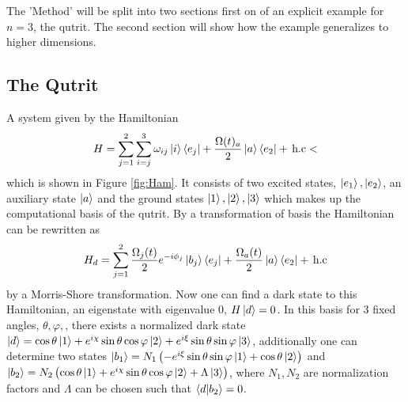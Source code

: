 
The 'Method' will be split into two sections first on of an explicit example for $n = 3$, the qutrit. The second section will show how the example generalizes to higher dimensions.


\subsection{The Qutrit}

A system given by the Hamiltonian
\begin{equation}
\label{eq:Ham}
H = \sum_{j = 1}^2 \sum_{i =j}^{3} \omega_{ij}\ket{i}\bra{e_j}  + \frac{\Omega(t)_{a}}{2}\ket{a}\bra{e_2}  +\,\text{h.c}<
\end{equation}
which is shown in Figure \ref{fig:Ham}.  It consists of two excited states, $\ket{e_1}, \ket{e_2}$, an auxiliary state $\ket{a}$ and the ground states $\ket{1}, \ket{2}, \ket{3}$ which 
makes up the computational basis of the qutrit. By a transformation of basis the Hamiltonian can be rewritten as 
\begin{equation}
\label{eq:Hamd}
H_d = \sum_{j = 1}^2 \frac{\Omega_j(t)}{2}e^{-i\phi_j}\ket{b_j}\bra{e_j}  + \frac{\Omega_a(t)}{2}\ket{a}\bra{e_2}  +\,\text{h.c}
\end{equation} 
by a Morris-Shore transformation\cite{morris}. Now one can find a dark state to this Hamiltonian, an eigenstate with eigenvalue $0$, $H\ket{d} = 0$. In this basis for 3 fixed angles, $\theta, \varphi, $, there exists a normalized dark state $\ket{d} = \cos\theta\ket{1} + e^{i\chi}\sin\theta\cos\varphi\ket{2} + e^{i\xi}\sin\theta\sin\varphi\ket{3}$, additionally one can determine two states $\ket{b_1} = N_1 \left(-e^{i\xi}\sin\theta\sin\varphi\ket{1} + \cos\theta\ket{2} \right)$ and $\ket{b_2} = N_2 \left(\cos\theta\ket{1} +  e^{i\chi}\sin\theta\cos\varphi\ket{2} + \Lambda \ket{3}\right ) $, where $N_1, N_2$ are normalization factors and $\Lambda$ can be chosen such that $\bra{d}\ket{b_2} = 0$.

